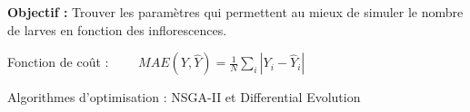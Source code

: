 \documentclass[11pt, a4paper]{beamer}
\newcommand{\w}{\widehat}
\newcommand{\1}{\mbox{\textbf{1}}}
\begin{document}
% 
%  
%  
%  
%  

%  
%  
%  
% 
%  
% 

\begin{frame}
 \textbf{Objectif :} Trouver les paramètres qui permettent au mieux de simuler le nombre de larves en fonction des inflorescences.
 
 \vspace*{1cm}
 
 Fonction de coût : $\qquad MAE\left( Y, \w Y \right) = \frac{1}{N}\sum_i|Y_i-\w Y_i|$
 
 \vspace*{0.75cm}
 
 Algorithmes d'optimisation : \hspace*{0.45cm} NSGA-II et Differential Evolution
\end{frame}
\end{document}
